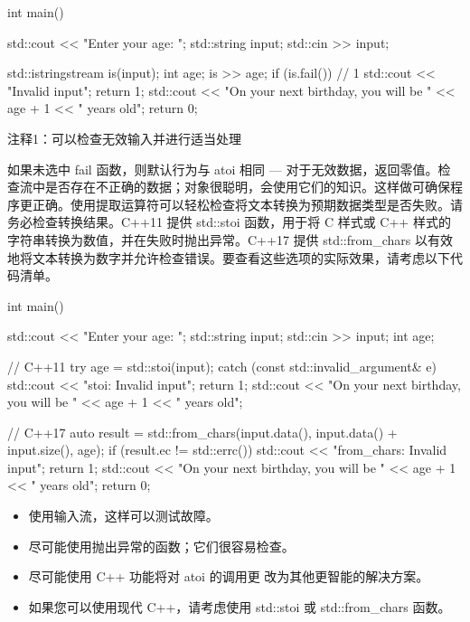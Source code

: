 \begin{cpp}
int main() {
  std::cout << "Enter your age: ";
  std::string input;
  std::cin >> input;

  std::istringstream is(input);
  int age;
  is >> age;
  if (is.fail()) { // 1
    std::cout << "Invalid input\n";
    return 1;
  }
  std::cout << "On your next birthday, you will be " << age + 1 << " years old\n";
  return 0;
}
\end{cpp}

{\footnotesize
注释1：可以检查无效输入并进行适当处理
}

如果未选中 fail 函数，则默认行为与 atoi 相同 — 对于无效数据，返回零值。检查流中是否存在不正确的数据；对象很聪明，会使用它们的知识。这样做可确保程序更正确。使用提取运算符可以轻松检查将文本转换为预期数据类型是否失败。请务必检查转换结果。C++11 提供 std::stoi 函数，用于将 C 样式或 C++ 样式的字符串转换为数值，并在失败时抛出异常。C++17 提供 std::from\_chars 以有效地将文本转换为数字并允许检查错误。要查看这些选项的实际效果，请考虑以下代码清单。


\begin{cpp}
int main() {
  std::cout << "Enter your age: ";
  std::string input;
  std::cin >> input;
  int age;

  // C++11
  try {
    age = std::stoi(input);
  } catch (const std::invalid_argument& e) {
    std::cout << "stoi: Invalid input\n";
    return 1;
  }
  std::cout << "On your next birthday, you will be " << age + 1 << " years old\n";

  // C++17
  auto result = std::from_chars(input.data(), input.data() + input.size(), age);
  if (result.ec != std::errc()) {
    std::cout << "from_chars: Invalid input\n";
    return 1;
  }
  std::cout << "On your next birthday, you will be " << age + 1 << " years old\n";
  return 0;
}
\end{cpp}


\begin{itemize}
\item
使用输入流，这样可以测试故障。

\item
尽可能使用抛出异常的函数；它们很容易检查。

\item
尽可能使用 C++ 功能将对 atoi 的调用更 改为其他更智能的解决方案。

\item
如果您可以使用现代 C++，请考虑使用 std::stoi 或 std::from\_chars 函数。
\end{itemize}




















